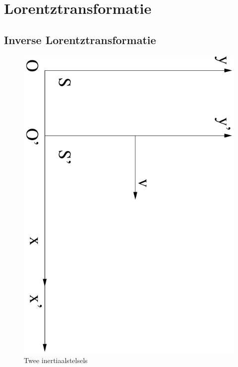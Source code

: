 \section{Lorentztransformatie}

\subsection{Inverse Lorentztransformatie}


\begin{figure}[ht]
\centering
\includegraphics[width=.5\textwidth]{oefeningen.pictures/twoframes}
\caption{Twee inertiaalstelsels}
\label{f:inertiaal}
\end{figure}

